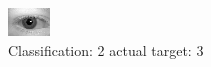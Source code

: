 \begin{figure}[h!]
\begin{center}
\includegraphics[width=0.60\columnwidth]{figures/ID582_class_2_target_3.png}
\end{center}
\caption{ Classification: 2 actual target: 3}
\label{fig:ID582_class_2_target_3}
\end{figure}
